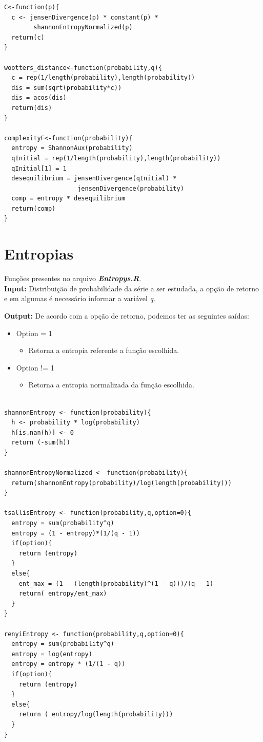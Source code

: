 \documentclass[12pt,letterpaper]{article}
\begin{document}
\begin{lstlisting}
C<-function(p){
  c <- jensenDivergence(p) * constant(p) *
  		shannonEntropyNormalized(p)
  return(c)
}

wootters_distance<-function(probability,q){
  c = rep(1/length(probability),length(probability))
  dis = sum(sqrt(probability*c))
  dis = acos(dis)
  return(dis)
}

complexityF<-function(probability){
  entropy = ShannonAux(probability)
  qInitial = rep(1/length(probability),length(probability))
  qInitial[1] = 1
  desequilibrium = jensenDivergence(qInitial) *
  					jensenDivergence(probability)
  comp = entropy * desequilibrium
  return(comp)
}
\end{lstlisting}

\section{Entropias}

Funções presentes no arquivo \textbf{\textit{Entropys.R}}.\\

\textbf{Input: } Distribuição de probabilidade da série a ser estudada, a opção de retorno e em algumas é necessário informar a variável \textit{q}.

\textbf{Output: } De acordo com a opção de retorno, podemos ter as seguintes saídas:

\begin{itemize}
\item Option = 1
	\begin{itemize}
	\item Retorna a entropia referente a função escolhida.
	\end{itemize}
\item Option != 1
	\begin{itemize}
	\item Retorna a entropia normalizada da função escolhida.
	\end{itemize}
\end{itemize}

\begin{lstlisting}

shannonEntropy <- function(probability){
  h <- probability * log(probability)
  h[is.nan(h)] <- 0
  return (-sum(h))
}

shannonEntropyNormalized <- function(probability){
  return(shannonEntropy(probability)/log(length(probability)))
}

tsallisEntropy <- function(probability,q,option=0){  
  entropy = sum(probability^q)
  entropy = (1 - entropy)*(1/(q - 1))
  if(option){
    return (entropy)
  }
  else{
    ent_max = (1 - (length(probability)^(1 - q)))/(q - 1)
    return( entropy/ent_max)
  }
}

renyiEntropy <- function(probability,q,option=0){
  entropy = sum(probability^q)
  entropy = log(entropy)
  entropy = entropy * (1/(1 - q))
  if(option){
    return (entropy)
  }
  else{
    return ( entropy/log(length(probability)))
  }
}
\end{lstlisting}
\end{document}
